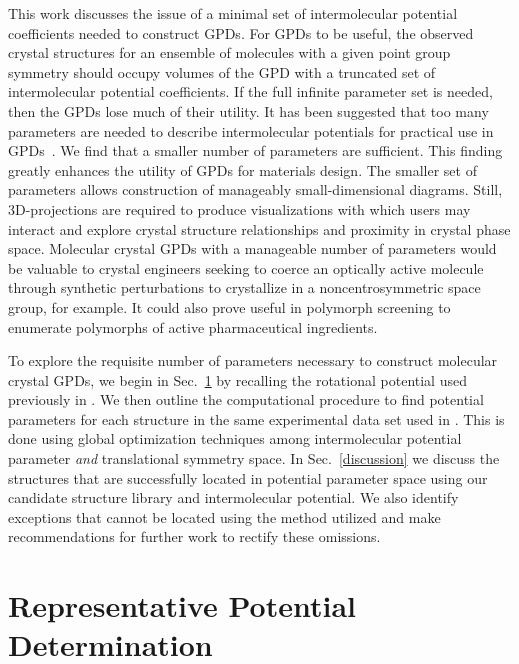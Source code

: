 \documentclass[preprint]{iucr}              %
\begin{document}
This work discusses the issue of a minimal set of intermolecular potential
coefficients needed to construct GPDs.  For GPDs to be useful, the observed
crystal structures for an ensemble of molecules with a given point group
symmetry should occupy volumes of the GPD with a truncated set of intermolecular
potential coefficients.  If the full infinite parameter set is needed, then the
GPDs lose much of their utility.  It has been suggested that too many parameters
are needed to describe intermolecular potentials for practical use in
GPDs~\cite{Briels80}.  We find that a smaller number of parameters are
sufficient.  This finding greatly enhances the utility of GPDs for materials
design. The smaller set of parameters allows construction of manageably
small-dimensional diagrams.  Still, 3D-projections are required to produce
visualizations with which users may interact and explore crystal structure
relationships and proximity in crystal phase space.  Molecular crystal GPDs with
a manageable number of parameters would be valuable to crystal engineers seeking
to coerce an optically active molecule through synthetic perturbations to
crystallize in a noncentrosymmetric space group, for example. It could also
prove useful in polymorph screening to enumerate polymorphs of active
pharmaceutical ingredients. 

To explore the requisite number of parameters necessary to construct molecular
crystal GPDs, we begin in Sec.~\ref{method} by recalling the rotational
potential used previously in \cite{Mettes04}.  We then outline the computational
procedure to find potential parameters for each structure in the same
experimental data set used in \cite{McClurg09}. This is done using global
optimization techniques among intermolecular potential parameter
\emph{and} translational symmetry space. In Sec.~\ref{discussion} we discuss the
structures that are successfully located in potential parameter space using our
candidate structure library and intermolecular potential.  We also identify
exceptions that cannot be located using the method utilized and make
recommendations for further work to rectify these omissions.


\section{Representative Potential Determination}
\label{method}
\end{document}
